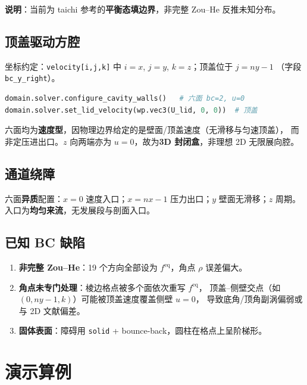 \documentclass[UTF8,a4paper,11pt]{ctexart}
\newcommand{\feq}{f^{\mathrm{eq}}}
\begin{document}
\textbf{说明}：当前为 taichi 参考的\textbf{平衡态填边界}，非完整 Zou--He 反推未知分布。

\subsection{顶盖驱动方腔}

坐标约定：\texttt{velocity[i,j,k]} 中 $i=x$, $j=y$, $k=z$；顶盖位于 $j=ny-1$
（字段 \texttt{bc\_y\_right}）。

\begin{lstlisting}[language=Python,caption={腔体边界配置}]
domain.solver.configure_cavity_walls()   # 六面 bc=2, u=0
domain.solver.set_lid_velocity(wp.vec3(U_lid, 0, 0))  # 顶盖
\end{lstlisting}

六面均为\textbf{速度型}，因物理边界给定的是壁面/顶盖速度（无滑移与匀速顶盖），
而非定压进出口。$z$ 向两端亦为 $u=0$，故为\textbf{3D 封闭盒}，非理想 2D 无限展向腔。

\subsection{通道绕障}

六面\textbf{异质}配置：$x=0$ 速度入口；$x=nx-1$ 压力出口；$y$ 壁面无滑移；$z$ 周期。
入口为\textbf{均匀来流}，无发展段与剖面入口。

\subsection{已知 BC 缺陷}

\begin{enumerate}
  \item \textbf{非完整 Zou--He}：19 个方向全部设为 $\feq$，角点 $\rho$ 误差偏大。
  \item \textbf{角点未专门处理}：棱边格点被多个面依次重写 $\feq$，
        顶盖--侧壁交点（如 $(0, ny-1, k)$）可能被顶盖速度覆盖侧壁 $u=0$，
        导致底角/顶角副涡偏弱或与 2D 文献偏差。
  \item \textbf{固体表面}：障碍用 \texttt{solid} + bounce-back，圆柱在格点上呈阶梯形。
\end{enumerate}

\section{演示算例}
\end{document}
